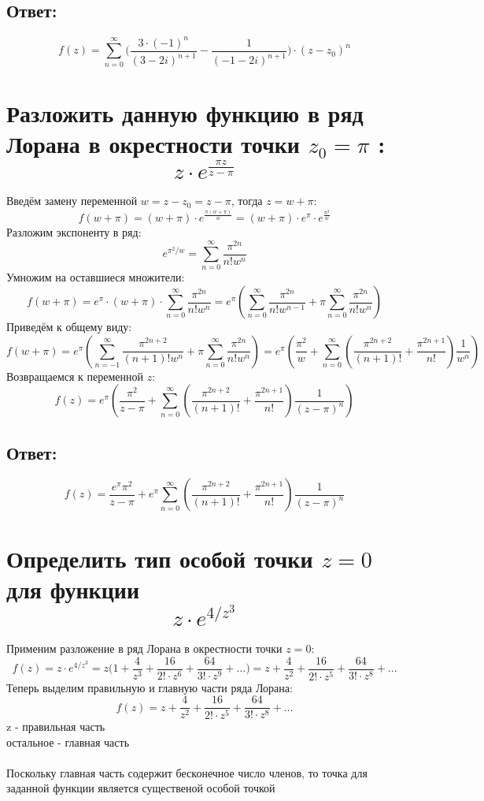 \documentclass[12pt]{article}
\begin{document}
\subsection*{Ответ:}
$$f(z) = \sum_{n=0}^{\infty} \bigg( \frac{3 \cdot (-1)^n}{(3 - 2i)^{n+1}} - \frac{1}{(-1 - 2i)^{n+1}} \bigg) \cdot (z-z_0)^n$$

\section{Разложить данную функцию в ряд Лорана в окрестности точки $z_0 = \pi$ : $$z\cdot e^{\frac{\pi z}{z - \pi}}$$}
Введём замену переменной \( w = z - z_0 = z - \pi \), тогда \( z = w + \pi \):
    $$f(w + \pi) = (w + \pi) \cdot e^{\frac{\pi(w + \pi)}{w}} = (w + \pi) \cdot e^{\pi} \cdot e^{\frac{\pi^2}{w}}$$
Разложим экспоненту в ряд:
    $$e^{{\pi^2}/{w}} = \sum_{n=0}^{\infty} \frac{\pi^{2n}}{n! w^n}$$
Умножим на оставшиеся множители:
$$f(w + \pi) = e^{\pi} \cdot (w + \pi) \cdot \sum_{n=0}^{\infty} \frac{\pi^{2n}}{n! w^n} = e^{\pi} \left( \sum_{n=0}^{\infty} \frac{\pi^{2n}}{n! w^{n-1}} + \pi \sum_{n=0}^{\infty} \frac{\pi^{2n}}{n! w^n} \right)$$
Приведём к общему виду:
$$f(w + \pi) = e^{\pi} \left( \sum_{n=-1}^{\infty} \frac{\pi^{2n+2}}{(n+1)! w^n} + \pi \sum_{n=0}^{\infty} \frac{\pi^{2n}}{n! w^n} \right) = e^{\pi} \left( \frac{\pi^2}{w} + \sum_{n=0}^{\infty} \left( \frac{\pi^{2n+2}}{(n+1)!} + \frac{\pi^{2n+1}}{n!} \right) \frac{1}{w^n} \right)$$
Возвращаемся к переменной \( z \):
$$f(z) = e^{\pi} \left( \frac{\pi^2}{z - \pi} + \sum_{n=0}^{\infty} \left( \frac{\pi^{2n+2}}{(n+1)!} + \frac{\pi^{2n+1}}{n!} \right) \frac{1}{(z - \pi)^n} \right)$$
\subsection*{Ответ:}
$$f(z) = \frac{e^{\pi} \pi^2}{z - \pi} + e^{\pi} \sum_{n=0}^{\infty} \left( \frac{\pi^{2n+2}}{(n+1)!} + \frac{\pi^{2n+1}}{n!} \right) \frac{1}{(z - \pi)^n}$$

\section{Определить тип особой точки $z = 0$ для функции $$z \cdot e^{{4}/{z^3}}$$}
Применим разложение в ряд Лорана в окрестности точки $z = 0$:\\
$$f(z) = z \cdot e^{{4}/{z^3}} = z\bigg(1 + \frac{4}{z^3} + \frac{16}{2! \cdot z^6} + \frac{64}{3! \cdot z^9} + ...\bigg) = z +  \frac{4}{z^2} + \frac{16}{2! \cdot z^5} + \frac{64}{3! \cdot z^8} + ...$$
Теперь выделим правильную и главную части ряда Лорана:
$$f(z) = z +  \frac{4}{z^2} + \frac{16}{2! \cdot z^5} + \frac{64}{3! \cdot z^8} + ...$$
z - правильная часть\\
остальное - главная часть\\
\\
Поскольку главная часть содержит бесконечное число членов, то точка для заданной функции является существеной особой точкой\\
\end{document}
